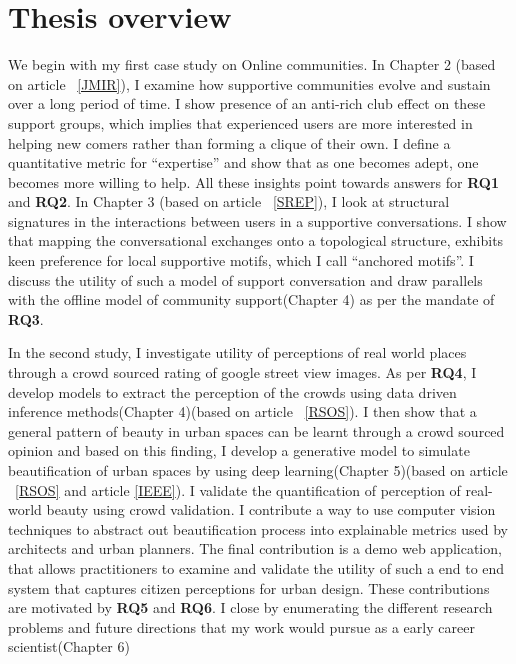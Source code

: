\section{Thesis overview}
We begin with my first case study on Online communities.
In Chapter 2 (based on article ~\ref{JMIR}), I examine how supportive communities evolve and sustain over a long period of time. I show presence of an anti-rich club effect on these support groups, which implies that experienced users are more interested in helping new comers rather than forming a clique of their own. I define a quantitative metric for ``expertise'' and show that as one becomes adept, one becomes more willing to help. All these insights point towards answers for \textbf{RQ1} and \textbf{RQ2}. In Chapter 3 (based on article ~\ref{SREP}), I look at structural signatures in the interactions between users in a supportive conversations. I show that mapping the conversational exchanges onto a topological structure, exhibits keen preference for local supportive motifs, which I call ``anchored motifs''. I discuss the utility of such a model of support conversation and draw parallels with the offline model of community support(Chapter 4) as per the mandate of \textbf{RQ3}. 

In the second study, I investigate utility of perceptions of real world places through a crowd sourced rating of google street view images. As per \textbf{RQ4}, I develop models to extract the perception of the crowds using data driven inference methods(Chapter 4)(based on article ~\ref{RSOS}). 
I then show that a general pattern of beauty in urban spaces can be learnt through a crowd sourced opinion and based on this finding, I develop a generative model to simulate beautification of urban spaces by using deep learning(Chapter 5)(based on article ~\ref{RSOS} and article \ref{IEEE}). I validate the quantification of perception of real-world beauty using crowd validation. I contribute a way to use computer vision techniques to abstract out beautification process into explainable metrics used by architects and urban planners. The final contribution is a demo web application, that allows practitioners to examine and validate the utility of such a end to end system that captures citizen perceptions for urban design. These contributions are motivated by \textbf{RQ5} and \textbf{RQ6}. 
I close by enumerating the different research problems and future directions that my work would pursue as a early career scientist(Chapter 6)








